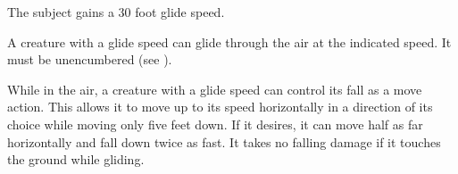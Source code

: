 \spellrng{\rngmed}
\spelldur{\durlong}
\begin{spelleffect}
  The subject gains a 30 foot glide speed.
\end{spelleffect}
\begin{spellnotes}
    A creature with a glide speed can glide through the air at the indicated speed. It must be unencumbered (see ).

    While in the air, a creature with a glide speed can control its fall as a move action. This allows it to move up to its speed horizontally in a direction of its choice while moving only five feet down. If it desires, it can move half as far horizontally and fall down twice as fast. It takes no falling damage if it touches the ground while gliding.
\end{spellnotes}

\begin{comment}
\spellsection{Ghoul Touch}
\spellschool{Necromancy (Flesh)}
\spelllvl{Sor/Wiz 3}
\spellrng{\rngtouch}
\spelltgt{Touched living creature}
\spelldur{\durshort}
\spellsave{None/Fortitude negates}
\spellsr{Yes (Fortitude)}
\begin{spelleffect}
  The subject is sickened, making it vulnerable.
\end{spelleffect}
\begin{spellblood}
  In addition, the subject is paralyzed if it fails a Fortitude save. Each round that it is paralyzed, the subject can make a new saving throw. If it succeeds, it is no longer paralyzed by the spell, though it is still sickened. In addition, as long as it is paralyzed, the subject exudes a carrion stench that causes all living creatures (except you) in a \areasmall radius spread to become sickened (Fortitude negates) for 5 rounds.
\end{spellblood}
\begin{spellnotes}
  A vulnerable creature takes a \minus2 penalty to attack rolls, saving throws, checks, DCs, and AC.
\end{spellnotes}
\end{comment}

